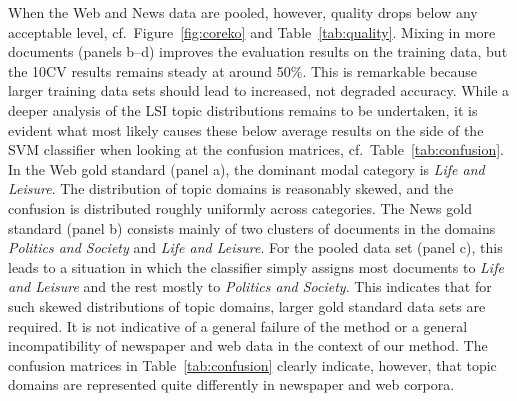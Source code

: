 \documentclass[11pt]{article}
\begin{document}
\enlargethispage{\baselineskip}
When the Web and News data are pooled, however, quality drops below any acceptable level, cf.\ Figure~\ref{fig:coreko} and Table~\ref{tab:quality}.
Mixing in more documents (panels b--d) improves the evaluation results on the training data, but the 10CV results remains steady at around 50\%.
This is remarkable because larger training data sets should lead to increased, not degraded accuracy.
While a deeper analysis of the LSI topic distributions remains to be undertaken, it is evident what most likely causes these below average results on the side of the SVM classifier when looking at the confusion matrices, cf.\ Table~\ref{tab:confusion}.
In the Web gold standard (panel a), the dominant modal category is \textit{Life and Leisure}.
The distribution of topic domains is reasonably skewed, and the confusion is distributed roughly uniformly across categories.
The News gold standard (panel b) consists mainly of two clusters of documents in the domains \textit{Politics and Society} and \textit{Life and Leisure}.
For the pooled data set (panel c), this leads to a situation in which the classifier simply assigns most documents to \textit{Life and Leisure} and the rest mostly to \textit{Politics and Society}.
This indicates that for such skewed distributions of topic domains, larger gold standard data sets are required.
It is not indicative of a general failure of the method or a general incompatibility of newspaper and web data in the context of our method.
The confusion matrices in Table~\ref{tab:confusion} clearly indicate, however, that topic domains are represented quite differently in newspaper and web corpora.
\end{document}
